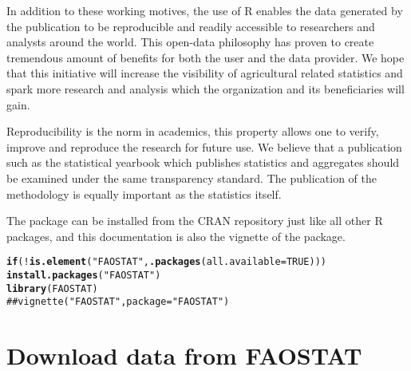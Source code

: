 \documentclass[nojss]{jss}\usepackage{graphicx, color}
\makeatletter
\newcommand{\hlfunctioncall}[1]{\textcolor[rgb]{0.501960784313725,0,0.329411764705882}{\textbf{#1}}}%
\newcommand{\hlstring}[1]{\textcolor[rgb]{0.6,0.6,1}{#1}}%
\newcommand{\hlcomment}[1]{\textcolor[rgb]{0.180392156862745,0.6,0.341176470588235}{#1}}%
\newenvironment{kframe}{%
 \def\at@end@of@kframe{}%
 \ifinner\ifhmode%
  \def\at@end@of@kframe{\end{minipage}}%
  \begin{minipage}{\columnwidth}%
 \fi\fi%
 \def\FrameCommand##1{\hskip\@totalleftmargin \hskip-\fboxsep
 \colorbox{shadecolor}{##1}\hskip-\fboxsep
     \hskip-\linewidth \hskip-\@totalleftmargin \hskip\columnwidth}%
 \MakeFramed {\advance\hsize-\width
   \@totalleftmargin\z@ \linewidth\hsize
   \@setminipage}}%
 {\par\unskip\endMakeFramed%
 \at@end@of@kframe}
\newenvironment{knitrout}{}{} %
\makeatother
\begin{document}
In addition to these working motives, the use of R enables the data
generated by the publication to be reproducible and readily accessible
to researchers and analysts around the world. This open-data philosophy
has proven to create tremendous amount of benefits for both the user
and the data provider. We hope that this initiative will increase the
visibility of agricultural related statistics and spark more research
and analysis which the organization and its beneficiaries will gain.


Reproducibility is the norm in academics, this property allows one to
verify, improve and reproduce the research for future use. We believe
that a publication such as the statistical yearbook which publishes
statistics and aggregates should be examined under the same
transparency standard. The publication of the methodology is equally
important as the statistics itself.




The package can be installed from the CRAN repository just like all
other R packages, and this documentation is also the vignette of the
package.

\begin{knitrout}
\color{fgcolor}\begin{kframe}
\begin{alltt}
\hlfunctioncall{if}(!\hlfunctioncall{is.element}(\hlstring{"FAOSTAT"}, \hlfunctioncall{.packages}(all.available = TRUE)))
   \hlfunctioncall{install.packages}(\hlstring{"FAOSTAT"})
\hlfunctioncall{library}(FAOSTAT)
\hlcomment{## vignette("FAOSTAT", package = "FAOSTAT")}
\end{alltt}
\end{kframe}
\end{knitrout}



\section{Download data from FAOSTAT}
\end{document}
